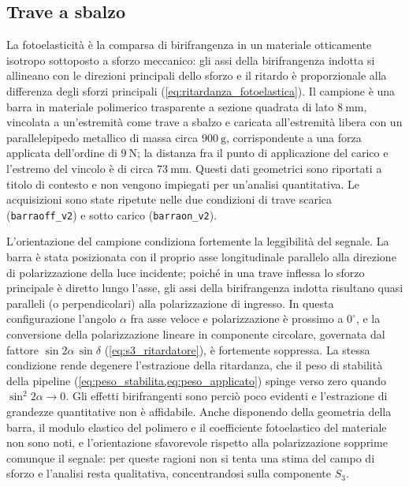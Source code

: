 \subsection{Trave a sbalzo}
\label{subsec:risultati_cantilever}

La fotoelasticità è la comparsa di birifrangenza in un materiale otticamente isotropo sottoposto a sforzo meccanico: gli assi della birifrangenza indotta si allineano con le direzioni principali dello sforzo e il ritardo è proporzionale alla differenza degli sforzi principali (\cref{eq:ritardanza_fotoelastica}). Il campione è una barra in materiale polimerico trasparente a sezione quadrata di lato $\SI{8}{\milli\meter}$, vincolata a un'estremità come trave a sbalzo e caricata all'estremità libera con un parallelepipedo metallico di massa circa $\SI{900}{\gram}$, corrispondente a una forza applicata dell'ordine di $\SI{9}{\newton}$; la distanza fra il punto di applicazione del carico e l'estremo del vincolo è di circa $\SI{73}{\milli\meter}$. Questi dati geometrici sono riportati a titolo di contesto e non vengono impiegati per un'analisi quantitativa. Le acquisizioni sono state ripetute nelle due condizioni di trave scarica (\texttt{barraoff\_v2}) e sotto carico (\texttt{barraon\_v2}).

L'orientazione del campione condiziona fortemente la leggibilità del segnale. La barra è stata posizionata con il proprio asse longitudinale parallelo alla direzione di polarizzazione della luce incidente; poiché in una trave inflessa lo sforzo principale è diretto lungo l'asse, gli assi della birifrangenza indotta risultano quasi paralleli (o perpendicolari) alla polarizzazione di ingresso. In questa configurazione l'angolo $\alpha$ fra asse veloce e polarizzazione è prossimo a $0^\circ$, e la conversione della polarizzazione lineare in componente circolare, governata dal fattore $\sin 2\alpha\,\sin\delta$ (\cref{eq:s3_ritardatore}), è fortemente soppressa. La stessa condizione rende degenere l'estrazione della ritardanza, che il peso di stabilità della pipeline (\cref{eq:peso_stabilita,eq:peso_applicato}) spinge verso zero quando $\sin^2 2\alpha \to 0$. Gli effetti birifrangenti sono perciò poco evidenti e l'estrazione di grandezze quantitative non è affidabile. Anche disponendo della geometria della barra, il modulo elastico del polimero e il coefficiente fotoelastico del materiale non sono noti, e l'orientazione sfavorevole rispetto alla polarizzazione sopprime comunque il segnale: per queste ragioni non si tenta una stima del campo di sforzo e l'analisi resta qualitativa, concentrandosi sulla componente $S_3$.

